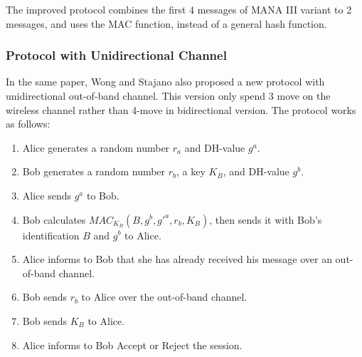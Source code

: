 The improved protocol combines the first 4 messages of MANA III variant to 2 messages, and uses the MAC function, instead of a general hash function. 
 
\subsubsection*{Protocol with Unidirectional Channel}

In the same paper, Wong and Stajano also proposed a new protocol with unidirectional out-of-band channel. This version only spend 3 move on the wireless channel rather than 4-move in bidirectional version. The protocol works as follows:
\begin{enumerate}
\item Alice generates a random number $r_a$ and DH-value $g^a$.
\item Bob generates a random number $r_b$, a key $K_B$, and DH-value $g^b$.
\item Alice sends $g^a$ to Bob. 
\item Bob calculates $MAC_{K_B}(B,g^b,g'^a,r_b,K_B)$, then sends it with Bob's identification $B$ and $g^b$ to Alice.
\item Alice informs to Bob that she has already received his message over an out-of-band channel. 
\item Bob sends $r_b$ to Alice over the out-of-band channel. 
\item Bob sends $K_B$ to Alice. 
\item Alice informs to Bob Accept or Reject the session.
\end{enumerate}

\begin{center}
\end{center}

